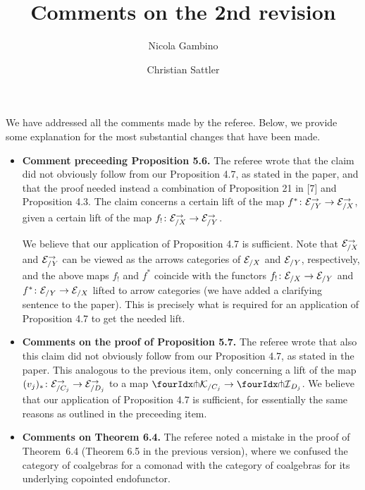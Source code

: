 \documentclass[reqno,10pt,a4paper,oneside,draft]{amsart}
\begin{document}
\title{Comments on the 2nd revision} 

\author{Nicola Gambino \and Christian Sattler} 

\maketitle

We have addressed all the comments made by the referee. Below, we provide some explanation for the most substantial changes that have been made. 

\begin{itemize}
\item {\bf Comment preceeding Proposition 5.6.} The referee wrote that the claim did not obviously follow from our Proposition 4.7, as stated in the paper, and that the proof needed instead a combination of Proposition 21 in [7] and Proposition 4.3.
The claim concerns a certain lift of the map $f^* \co \cal{E}_{/Y}^\to \to \cal{E}_{/X}^\to$, given a certain lift of the map $f_! \co \cal{E}_{/X}^\to \to \cal{E}_{/Y}^\to$.

We believe that our application of Proposition 4.7 is sufficient.
Note that $\cal{E}_{/X}^\to$ and $\cal{E}_{/Y}^\to$ can be viewed as the arrows categories of $\cal{E}_{/X}$ and $\cal{E}_{/Y}$, respectively, and the above maps $f_!$ and $f^*$ coincide with the functors $f_! \co \cal{E}_{/X} \to \cal{E}_{/Y}$ and $f^* \co \cal{E}_{/Y} \to \cal{E}_{/X}$ lifted to arrow categories (we have added a clarifying sentence to the paper).
This is precisely what is required for an application of Proposition 4.7 to get the needed lift.

\item {\bf Comments on the proof of Proposition 5.7.} The referee wrote that also this claim did not obviously follow from our Proposition 4.7, as stated in the paper.
This analogous to the previous item, only concerning a lift of the map $(v_j)_* \co \cal{E}_{/C_j}^\to \to \cal{E}_{/D_j}^\to$ to a map $\liftr{\cal{K}}_{/C_j} \to \liftr{\cal{I}}_{D_j}$.
We believe that our application of Proposition 4.7 is sufficient, for essentially the same reasons as outlined in the preceeding item.

\item {\bf Comments on Theorem 6.4.} The referee noted a mistake in the proof of Theorem~6.4 (Theorem 6.5 in the previous version), where we 
confused the category of coalgebras for a comonad with the category of coalgebras for its underlying copointed endofunctor. 


\end{itemize}
\end{document}
